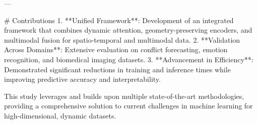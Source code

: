 ---

# Contributions  
1. **Unified Framework**: Development of an integrated framework that combines dynamic attention, geometry-preserving encoders, and multimodal fusion for spatio-temporal and multimodal data.  
2. **Validation Across Domains**: Extensive evaluation on conflict forecasting, emotion recognition, and biomedical imaging datasets.  
3. **Advancement in Efficiency**: Demonstrated significant reductions in training and inference times while improving predictive accuracy and interpretability.  

This study leverages and builds upon multiple state-of-the-art methodologies, providing a comprehensive solution to current challenges in machine learning for high-dimensional, dynamic datasets.